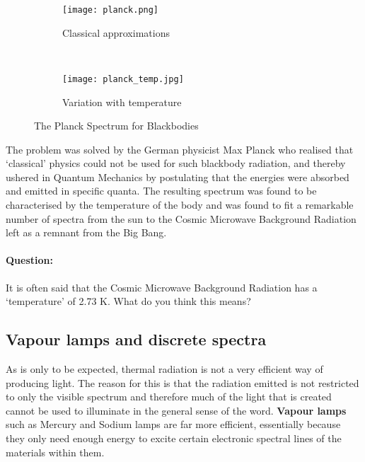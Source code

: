 \begin{figure}[!htb]
\centering
\begin{subfigure}[b]{0.45\textwidth}
        \texttt{[image: planck.png]}
        \caption{Classical approximations}
        \label{planck_approx}
    \end{subfigure}
    ~ %
    \begin{subfigure}[b]{0.45\textwidth}
        \hspace{0.5cm}\texttt{[image: planck\_temp.jpg]}
        \caption{Variation with temperature}
        \label{planck_temp}
    \end{subfigure}
\caption{The Planck Spectrum for Blackbodies}
\label{planck}
\end{figure}

The problem was solved by the German physicist Max Planck who realised that `classical' physics could not be used for such blackbody radiation, and thereby ushered in Quantum Mechanics by postulating that the energies were absorbed and emitted in specific quanta. The resulting spectrum was found to be characterised by the temperature of the body and was found to fit a remarkable number of spectra from the sun to the Cosmic Microwave Background Radiation left as a remnant from the Big Bang.

\begin{tcolorbox}
\paragraph{Question: } It is often said that the Cosmic Microwave Background Radiation has a `temperature' of 2.73 K. What do you think this means?
\end{tcolorbox}

\subsection{Vapour lamps and discrete spectra}

As is only to be expected, thermal radiation is not a very efficient way of producing light. The reason for this is that the radiation emitted is not restricted to only the visible spectrum and therefore much of the light that is created cannot be used to illuminate in the general sense of the word. \textbf{Vapour lamps} such as Mercury and Sodium lamps are far more efficient, essentially because they only need enough energy to excite certain electronic spectral lines of the materials within them.

